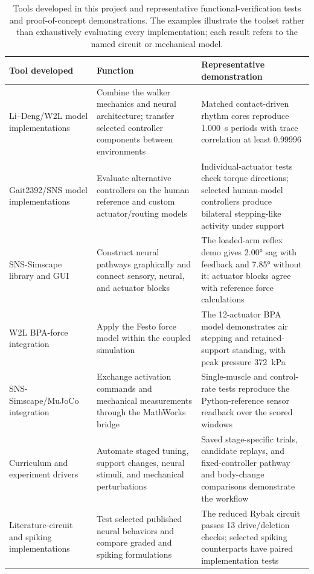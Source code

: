 \begin{table}[htbp]
\caption[Tools developed and representative demonstrations]{Tools developed in this project and representative functional-verification tests and proof-of-concept demonstrations. The examples illustrate the toolset rather than exhaustively evaluating every implementation; each result refers to the named circuit or mechanical model.}
\label{tab:sns_capability}
\small
\begin{tabularx}{\textwidth}{@{}>{\raggedright\arraybackslash}p{}*{2}{>{\raggedright\arraybackslash}X}@{}}
\toprule
\textbf{Tool developed} & \textbf{Function} & \textbf{Representative demonstration} \\
\midrule
Li--Deng/W2L model implementations & Combine the walker mechanics and neural architecture; transfer selected controller components between environments & Matched contact-driven rhythm cores reproduce \qty{1.000}{\second} periods with trace correlation at least 0.99996 \\
Gait2392/SNS model implementations & Evaluate alternative controllers on the human reference and custom actuator/routing models & Individual-actuator tests check torque directions; selected human-model controllers produce bilateral stepping-like activity under support \\
SNS-Simscape library and GUI & Construct neural pathways graphically and connect sensory, neural, and actuator blocks & The loaded-arm reflex demo gives \ang{2.00} sag with feedback and \ang{7.85} without it; actuator blocks agree with reference force calculations \\
W2L BPA-force integration & Apply the Festo force model within the coupled simulation & The 12-actuator BPA model demonstrates air stepping and retained-support standing, with peak pressure \qty{372}{\kPa} \\
SNS-Simscape/MuJoCo integration & Exchange activation commands and mechanical measurements through the MathWorks bridge & Single-muscle and control-rate tests reproduce the Python-reference sensor readback over the scored windows \\
Curriculum and experiment drivers & Automate staged tuning, support changes, neural stimuli, and mechanical perturbations & Saved stage-specific trials, candidate replays, and fixed-controller pathway and body-change comparisons demonstrate the workflow \\
Literature-circuit and spiking implementations & Test selected published neural behaviors and compare graded and spiking formulations & The reduced Rybak circuit passes 13 drive/deletion checks; selected spiking counterparts have paired implementation tests \\
\bottomrule
\end{tabularx}
\end{table}
